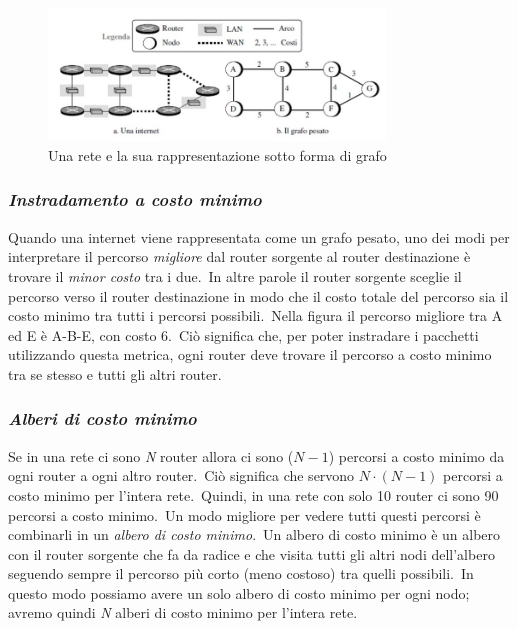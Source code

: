 \begin{figure}[H]
    \centering
    \includegraphics[width=0.8\textwidth]{immagini/Rete_grafo.jpg}
    \caption*{Una rete e la sua rappresentazione sotto forma di grafo}
\end{figure}

\subsubsection{\emph{Instradamento a costo minimo}}

Quando una internet viene rappresentata come un grafo pesato, uno dei modi per interpretare il percorso \emph{migliore} dal router sorgente al router destinazione è trovare il \emph{minor costo} tra i due.\
In altre parole il router sorgente sceglie il percorso verso il router destinazione in modo che il costo totale del percorso sia il costo minimo tra tutti i percorsi possibili.\
Nella figura il percorso migliore tra A ed E è A-B-E, con costo 6.\
Ciò significa che, per poter instradare i pacchetti utilizzando questa metrica, ogni router deve trovare il percorso a costo minimo tra se stesso e tutti gli altri router.

\subsubsection{\emph{Alberi di costo minimo}}

Se in una rete ci sono \emph{N} router allora ci sono ($N-1$) percorsi a costo minimo da ogni router a ogni altro router.\
Ciò significa che servono $N \cdot (N-1)$ percorsi a costo minimo per l'intera rete.\
Quindi, in una rete con solo 10 router ci sono 90 percorsi a costo minimo.\
Un modo migliore per vedere tutti questi percorsi è combinarli in un \emph{albero di costo minimo}.\
Un albero di costo minimo è un albero con il router sorgente che fa da radice e che visita tutti gli altri nodi dell'albero seguendo sempre il percorso più corto (meno costoso) tra quelli possibili.\
In questo modo possiamo avere un solo albero di costo minimo per ogni nodo; avremo quindi \emph{N} alberi di costo minimo per l'intera rete.

